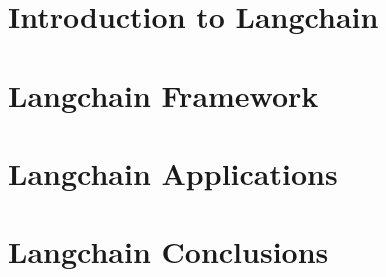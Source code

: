 \section[Intro]{Introduction to Langchain}


\section[FRM]{Langchain Framework}


\section[Apps]{Langchain Applications}


\section[Concl]{Langchain Conclusions}
